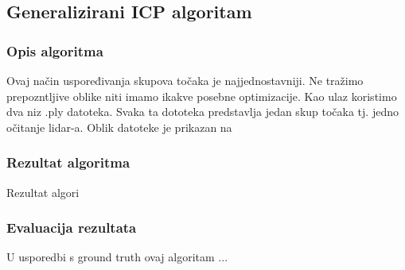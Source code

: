 \subsection{Generalizirani ICP algoritam}

\subsubsection{Opis algoritma}
Ovaj način uspoređivanja skupova točaka je najjednostavniji. Ne tražimo prepozntljive oblike niti imamo ikakve posebne optimizacije. Kao ulaz koristimo dva niz .ply datoteka. Svaka ta dototeka predstavlja jedan skup točaka tj. jedno očitanje lidar-a. Oblik datoteke je prikazan na 





\subsubsection{Rezultat algoritma}
Rezultat algori

\subsubsection{Evaluacija rezultata}
U usporedbi s ground truth ovaj algoritam ...
